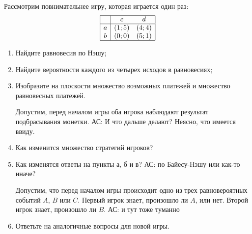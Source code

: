 \begin{problem}

Рассмотрим повнимательнее игру, которая играется один раз:
\[\begin{array}{|c|cc|}  \hline {} & {c} & {d} \\  \hline {a} & {\left(1;5\right)} & {\left(4;4\right)} \\ {b} & {\left(0;0\right)} & {\left(5;1\right)} \\  \hline  \end{array}\]
\begin{enumerate}
\item Найдите равновесия по Нэшу;\par
\item Найдите вероятности каждого из четырех исходов в равновесиях;\par
\item  Изобразите на плоскости множество возможных платежей и множество равновесных платежей.\par
Допустим, перед началом игры оба игрока наблюдают результат подбрасывания монетки. {\red АС: И что дальше делают? Неясно, что имеется ввиду.}\par
\item Как изменится множество стратегий игроков?\par
\item Как изменятся ответы на пункты а, б и в? {\red АС: по Байесу-Нэшу или как-то иначе?} \par
Допустим, что перед началом игры происходит одно из трех равновероятных событий  $A$,  $B$  или  $C$. Первый игрок знает, произошло ли  $A$, или нет. Второй игрок знает, произошло ли  $B$. {\red АС: и тут тоже туманно}\par
\item Ответьте на аналогичные вопросы для новой игры.\par
\end{enumerate}


\begin{sol}

\end{sol}
\end{problem}



